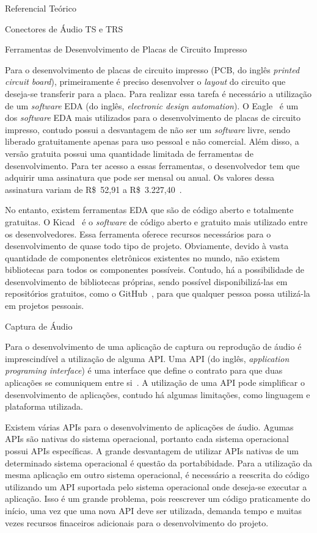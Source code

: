 \begin{chapter}{Referencial Teórico}
\begin{section}{Conectores de Áudio TS e TRS}
\end{section}


\begin{section}{Ferramentas de Desenvolvimento de Placas de Circuito Impresso}

Para o desenvolvimento de placas de circuito impresso (PCB, do inglês
\textit{printed circuit board}), primeiramente é
preciso desenvolver o \textit{layout} do circuito que deseja-se transferir
para a placa. Para realizar essa tarefa é necessário a utilização de um
\textit{software} EDA (do inglês, \textit{electronic design automation}). O
Eagle~\cite{eagle} é um dos \textit{software} EDA mais utilizados para o
desenvolvimento de placas de circuito impresso, contudo possui a desvantagem de
não ser um \textit{software} livre, sendo liberado gratuitamente apenas para uso
pessoal e não comercial. Além disso, a versão gratuita possui uma quantidade
limitada de ferramentas de desenvolvimento. Para ter acesso a essas ferramentas,
o desenvolvedor tem que adquirir uma assinatura que pode ser mensal ou anual. Os
valores dessa assinatura variam de R\$~52,91 a
R\$~3.227,40~\cite{EagleAssinatura}. 
 
No entanto, existem ferramentas EDA que são de código aberto e totalmente
gratuitas. O Kicad~\cite{kicad} é o  \textit{software} de código aberto e
gratuito mais utilizado entre os desenvolvedores. Essa ferramenta oferece
recursos necessários para o desenvolvimento de quase todo tipo de projeto.
Obviamente, devido à vasta quantidade de componentes eletrônicos existentes no
mundo, não existem bibliotecas para todos os componentes possíveis. Contudo, há
a possibilidade de desenvolvimento de bibliotecas próprias, sendo possível
disponibilizá-las em repositórios gratuitos, como o GitHub~\cite{github}, para
que qualquer pessoa possa utilizá-la em projetos pessoais.  
\end{section}


\begin{section}{Captura de Áudio}

Para o desenvolvimento de uma aplicação de captura ou reprodução de áudio é
imprescindível a utilização de alguma API. Uma API (do inglês,
\textit{application programing interface}) é uma interface que define o contrato
para que duas aplicações se comuniquem entre si~\cite{API17}. A utilização de
uma API pode simplificar o desenvolvimento de aplicações, contudo há algumas
limitações, como linguagem e plataforma utilizada. 

Existem várias APIs para o desenvolvimento de aplicações de áudio. Agumas APIs
são nativas do sistema operacional, portanto cada sistema operacional possui
APIs específicas. A grande desvantagem de utilizar APIs nativas de um
determinado sistema operacional é questão da portabibidade. Para a utilização da
mesma aplicação em outro sistema operacional, é necessário a reescrita do código
utilizando um API suportada pelo sistema operacional onde deseja-se executar a
aplicação. Isso é um grande problema, pois reescrever um código praticamente do
início, uma vez que uma nova API deve ser utilizada, demanda tempo e muitas vezes
recursos finaceiros adicionais para o desenvolvimento do projeto.



\end{section}
\end{chapter}
